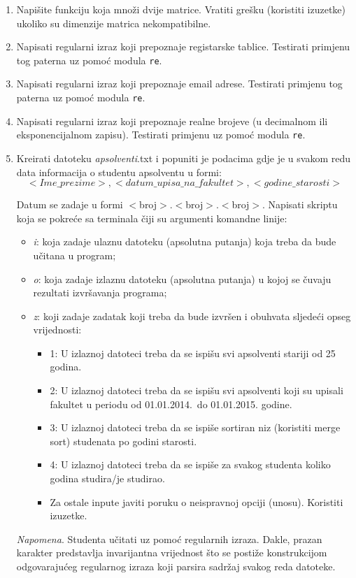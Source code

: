 \begin{enumerate}
	\item Napišite funkciju koja množi dvije matrice. Vratiti grešku (koristiti izuzetke) ukoliko su dimenzije matrica nekompatibilne.  
	 
	\item Napisati regularni izraz koji prepoznaje registarske tablice. Testirati primjenu tog paterna uz pomoć modula \texttt{re}.
	
	\item Napisati regularni izraz koji prepoznaje email adrese. Testirati primjenu tog paterna uz pomoć modula \texttt{re}.
	
	\item Napisati regularni izraz koji prepoznaje realne brojeve (u decimalnom ili eksponencijalnom zapisu). Testirati primjenu uz pomoć modula \texttt{re}.
	
	
	\item Kreirati datoteku \textit{apsolventi}.txt i popuniti je podacima gdje je u svakom redu data
	informacija o studentu apsolventu u formi: 
	 $$<Ime\_prezime>, <datum\_upisa\_na\_fakultet>, <godine\_starosti>$$ 
	
	Datum se zadaje u formi $<$broj$>$.$<$broj$>$.$<$broj$>$. Napisati skriptu koja se pokreće sa terminala čiji su argumenti komandne linije:
	\begin{itemize}
		\item  	\textit{i}: koja zadaje ulaznu datoteku (apsolutna putanja) koja treba da bude učitana u
	program;
	     \item \textit{o}: koja zadaje izlaznu datoteku (apsolutna putanja) u kojoj se čuvaju rezultati	izvršavanja programa;
	     \item  \textit{z}: koji zadaje zadatak koji treba da bude izvršen i obuhvata sljedeći opseg vrijednosti: 
	     \begin{itemize}
	     	\item  1: U izlaznoj datoteci treba da se ispišu svi apsolventi stariji od 25 godina.
             \item 2: U izlaznoj datoteci treba da se ispišu svi apsolventi koji su upisali fakultet u periodu od 01.01.2014.\ do 01.01.2015. godine.
	         \item 3: U izlaznoj datoteci treba da se ispiše sortiran niz (koristiti merge sort) studenata po godini starosti.
	         \item 4: U izlaznoj datoteci treba da se ispiše za svakog studenta koliko godina studira/je studirao.
	        \item Za ostale inpute javiti poruku o neispravnoj opciji (unosu). Koristiti izuzetke.
	         \end{itemize}
       \end{itemize}
	\textit{Napomena}. Studenta učitati uz pomoć regularnih izraza. Dakle, prazan karakter predstavlja 
	invarijantna vrijednost što se postiže konstru\-kcijom odgovarajućeg regularnog izraza koji parsira  sadržaj svakog reda  datoteke.
	

\end{enumerate}
